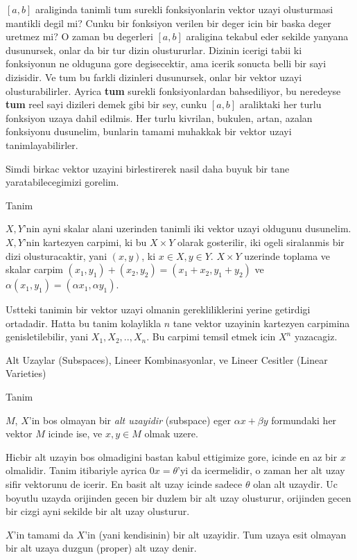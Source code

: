 \documentclass[12pt,fleqn]{article}
\begin{document}
$[a,b]$ araliginda tanimli tum surekli fonksiyonlarin vektor uzayi
olusturmasi mantikli degil mi? Cunku bir fonksiyon verilen bir deger icin
bir baska deger uretmez mi? O zaman bu degerleri $[a,b]$ araligina tekabul
eder sekilde yanyana dusunursek, onlar da bir tur dizin
olustururlar. Dizinin icerigi tabii ki fonksiyonun ne olduguna gore
degisecektir, ama icerik sonucta belli bir sayi dizisidir. Ve tum bu farkli
dizinleri dusunursek, onlar bir vektor uzayi olusturabilirler. Ayrica
\textbf{tum} surekli fonksiyonlardan bahsediliyor, bu neredeyse
\textbf{tum} reel sayi dizileri demek gibi bir sey, cunku $[a,b]$
araliktaki her turlu fonksiyon uzaya dahil edilmis. Her turlu kivrilan,
bukulen, artan, azalan fonksiyonu dusunelim, bunlarin tamami muhakkak bir
vektor uzayi tanimlayabilirler. 

Simdi birkac vektor uzayini birlestirerek nasil daha buyuk bir tane
yaratabilecegimizi gorelim. 

Tanim

$X,Y$'nin ayni skalar alani uzerinden tanimli iki vektor uzayi oldugunu
dusunelim. $X,Y$'nin kartezyen carpimi, ki bu $X \times Y$ olarak
gosterilir, iki ogeli siralanmis bir dizi olusturacaktir, 
yani $(x,y)$, ki $ x \in X, y \in Y$. $X \times Y$ uzerinde toplama ve
skalar carpim $(x_1,y_1) + (x_2,y_2) = (x_1+x_2, y_1+y_2)$ ve
$\alpha(x_1,y_1) = (\alpha x_1,\alpha y_1)$. 

Ustteki tanimin bir vektor uzayi olmanin gerekliliklerini yerine getirdigi
ortadadir. Hatta bu tanim kolaylikla $n$ tane vektor uzayinin kartezyen
carpimina genisletilebilir, yani $X_1,X_2,..,X_n$. Bu carpimi temsil etmek
icin $X^n$ yazacagiz. 

Alt Uzaylar (Subspaces), Lineer Kombinasyonlar, ve Lineer Cesitler (Linear Varieties) 

Tanim 

$M$, $X$'in bos olmayan bir {\em alt uzayidir} (subspace) eger $\alpha x + \beta y$
formundaki her vektor $M$ icinde ise, ve $x,y \in M$ olmak uzere. 

Hicbir alt uzayin bos olmadigini bastan kabul ettigimize gore, icinde en az
bir $x$ olmalidir. Tanim itibariyle ayrica  $0 x = \theta$'yi da
icermelidir, o zaman her alt uzay sifir vektorunu de icerir. En basit alt
uzay icinde sadece $\theta$ olan alt uzaydir. Uc boyutlu uzayda orijinden
gecen bir duzlem bir alt uzay olusturur, orijinden gecen bir cizgi ayni
sekilde bir alt uzay olusturur. 

$X$'in tamami da $X$'in (yani kendisinin) bir alt uzayidir. Tum uzaya esit
olmayan bir alt uzaya duzgun (proper) alt uzay denir. 
\end{document}
